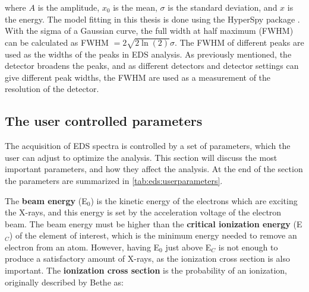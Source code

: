 where $A$ is the amplitude, $x_0$ is the mean, $\sigma$ is the standard deviation, and $x$ is the energy.
The model fitting in this thesis is done using the HyperSpy package \cite{hyperspy_1.7.1}.
With the sigma of a Gaussian curve, the full width at half maximum (FWHM) can be calculated as FWHM $= 2\sqrt{2\ln(2)}\sigma$.
The FWHM of different peaks are used as the widths of the peaks in EDS analysis.
As previously mentioned, the detector broadens the peaks, and as different detectors and detector settings can give different peak widths, the FWHM are used as a measurement of the resolution of the detector.
































\clearpage



\subsection{The user controlled parameters}
\label{theory:eds:user_controlled_parameters}

The acquisition of EDS spectra is controlled by a set of parameters, which the user can adjust to optimize the analysis.
This section will discuss the most important parameters, and how they affect the analysis.
At the end of the section the parameters are summarized in \cref{tab:eds:userparameters}.

The \textbf{beam energy} (E$_0$) is the kinetic energy of the electrons which are exciting the X-rays, and this energy is set by the acceleration voltage of the electron beam.
The beam energy must be higher than the \textbf{critical ionization energy} (E$_C$) of the element of interest, which is the minimum energy needed to remove an electron from an atom.
However, having E$_0$ just above E$_C$ is not enough to produce a satisfactory amount of X-rays, as the ionization cross section is also important.
The \textbf{ionization cross section} is the probability of an ionization, originally described by Bethe \cite{inokuti_on_bethe_1971} as:

